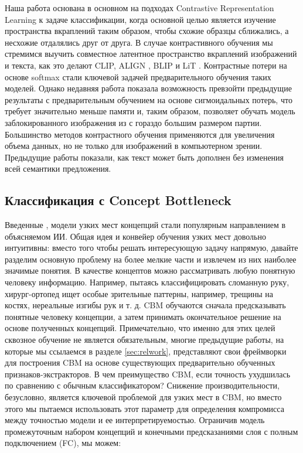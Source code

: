 Наша работа основана в основном на подходах Contrastive Representation Learning к задаче классификации, когда основной целью является изучение пространства вкраплений таким образом, чтобы схожие образцы сближались, а несхожие отдалялись друг от друга. В случае контрастивного обучения мы стремимся выучить совместное латентное пространство вкраплений изображений и текста, как это делают CLIP, ALIGN \cite{jia2021scaling}, BLIP \cite{li2022blip} и LiT \cite{zhai2022lit}.
Контрастные потери на основе softmax \cite{1467314} стали ключевой задачей предварительного обучения таких моделей. Однако недавняя работа \cite{zhai2023sigmoid} показала возможность превзойти предыдущие результаты с предварительным обучением на основе сигмоидальных потерь, что требует значительно меньше памяти и, таким образом, позволяет обучать модель заблокированного изображения из \cite{zhai2022lit} с гораздо большим размером партии. Большинство методов контрастного обучения применяются для увеличения объема данных, но не только для изображений в компьютерном зрении. Предыдущие работы \cite{wei2019eda,kobayashi2018contextual,fang2020cert,shen2020simple} показали, как текст может быть дополнен без изменения всей семантики предложения.

\subsection{Классификация с Concept Bottleneck}\label{sec:bottls}

Введенные \cite{koh2020concept}, модели узких мест концепций стали популярным направлением в объясняемом ИИ. Общая идея и конвейер обучения узких мест довольно интуитивны: вместо того чтобы решать интересующую задачу напрямую, давайте разделим основную проблему на более мелкие части и извлечем из них наиболее значимые понятия. В качестве концептов можно рассматривать любую понятную человеку информацию. Например, пытаясь классифицировать сломанную руку, хирург-ортопед ищет особые зрительные паттерны, например, трещины на костях, нереальные изгибы рук и т. д. CBM обучаются сначала предсказывать понятные человеку концепции, а затем принимать окончательное решение на основе полученных концепций. Примечательно, что именно для этих целей сквозное обучение не является обязательным, многие предыдущие работы, на которые мы ссылаемся в разделе \ref{sec:relwork}, представляют свои фреймворки для построения CBM на основе существующих предварительно обученных признаков-экстракторов. В чем преимущество CBM, если точность ухудшилась по сравнению с обычным классификатором? Снижение производительности, безусловно, является ключевой проблемой для узких мест в CBM, но вместо этого мы пытаемся использовать этот параметр для определения компромисса между точностью модели и ее интерпретируемостью. Ограничив модель промежуточным набором концепций и конечными предсказаниями слоя с полным подключением (FC), мы можем: 

